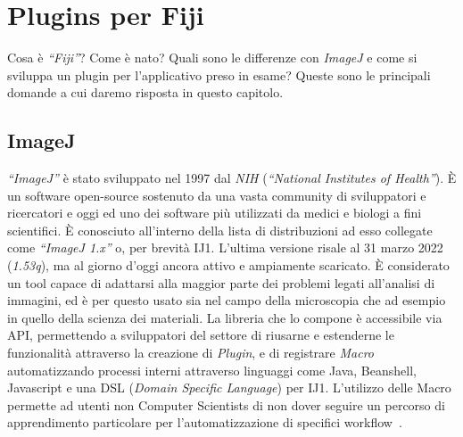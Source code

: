 \chapter{Plugins per Fiji}
\label{chap:plugins}
\noindent Cosa è \textit{``Fiji''}? Come è nato? Quali sono le differenze con \textit{ImageJ} e come si sviluppa un plugin per l'applicativo preso in esame? Queste sono le principali domande a cui daremo risposta in questo capitolo.

\section{ImageJ}
\noindent \textit{``ImageJ''} è stato sviluppato nel 1997 dal \textit{NIH} (\textit{``National Institutes of Health''}). È un software open-source sostenuto da una vasta community di sviluppatori e ricercatori e oggi ed uno dei software più utilizzati da medici e biologi a fini scientifici.
È conosciuto all'interno della lista di distribuzioni ad esso collegate come \textit{``ImageJ 1.x''} o, per brevità IJ1. L'ultima versione risale al 31 marzo 2022 (\textit{1.53q}), ma al giorno d'oggi ancora attivo e ampiamente scaricato. È considerato un tool capace di adattarsi alla maggior parte dei problemi legati all'analisi di immagini, ed è per questo usato sia nel campo della microscopia che ad esempio in quello della scienza dei materiali. La libreria che lo compone è accessibile via API, permettendo a sviluppatori del settore di riusarne e estenderne le funzionalità attraverso la creazione di \textit{Plugin}, e di registrare \textit{Macro} automatizzando processi interni attraverso linguaggi come Java, Beanshell, Javascript e una DSL (\textit{Domain Specific Language}) per IJ1. L'utilizzo delle Macro permette ad utenti non Computer Scientists di non dover seguire un percorso di apprendimento particolare per l'automatizzazione di specifici workflow~\cite{Schneider2012}.


